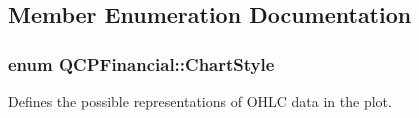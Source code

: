 \subsection{Member Enumeration Documentation}
\subsubsection[{\texorpdfstring{Chart\+Style}{ChartStyle}}]{\setlength{\rightskip}{0pt plus 5cm}enum {\bf Q\+C\+P\+Financial\+::\+Chart\+Style}}\hypertarget{class_q_c_p_financial_a0f800e21ee98d646dfc6f8f89d10ebfb}{}\label{class_q_c_p_financial_a0f800e21ee98d646dfc6f8f89d10ebfb}
Defines the possible representations of O\+H\+LC data in the plot.

